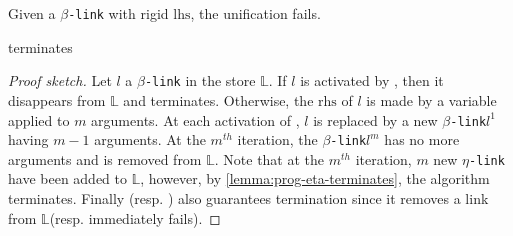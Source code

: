 \documentclass[sigconf,natbib=false,review]{acmart}
\newcommand{\llambda}{\ensuremath{\mathcal{L}_\lambda}\xspace}
\newcommand{\linkMacro}[1]{\ensuremath{#1}\texttt{-link}\xspace}
\newcommand{\linkbeta}{\linkMacro{\beta}}
\newcommand{\linketa} {\linkMacro{\eta}}
\newcommand{\lhs}{\ensuremath{\mathrm{lhs}}\xspace}
\newcommand{\rhs}{\ensuremath{\mathrm{rhs}}\xspace}
\newcommand{\linkStore}{\ensuremath{\mathbb{L}}\xspace}
\begin{document}
\begin{definition}[\progBetaLH]
  Given a \linkbeta with rigid \lhs, the unification fails.
  \label{def:progBetaLH}
\end{definition}

\begin{lemma}
   terminates
\end{lemma}

\begin{proof}[Proof sketch]
  Let $l$ a \linkbeta in the store \linkStore. If $l$ is activated by
  \progBetaRH, then it disappears from \linkStore and 
  terminates. Otherwise, the \rhs of $l$ is made by a variable applied to $m$
  arguments. At each activation of \progBetaLL, $l$ is replaced by a new
  \linkbeta $l^1$ having $m-1$ arguments. At the $m^{th}$ iteration, the
  \linkbeta $l^m$ has no more arguments and is removed from \linkStore.
  Note that at the $m^{th}$ iteration, $m$ new \linketa have been added to
  \linkStore, however, by \cref{lemma:prog-eta-terminates}, the algorithm
  terminates. Finally \progBetaDedup (resp. \progBetaLH) also guarantees termination since 
  it removes a link from \linkStore (resp. immediately fails).  

\end{proof}

\end{document}
